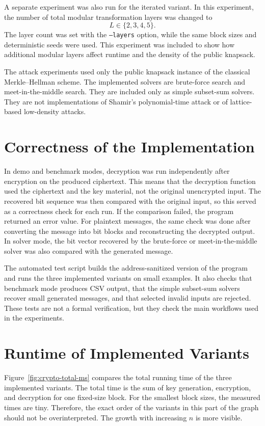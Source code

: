 A separate experiment was also run for the iterated variant. In this
experiment, the number of total modular transformation layers was changed to
\[
    L \in \{2,3,4,5\}.
\]
The layer count was set with the \texttt{--layers} option, while the same
block sizes and deterministic seeds were used. This experiment was included
to show how additional modular layers affect runtime and the density of the
public knapsack.

The attack experiments used only the public knapsack instance of the classical
Merkle--Hellman scheme. The implemented solvers are brute-force search and
meet-in-the-middle search. They are included only as simple subset-sum solvers.
They are not implementations of Shamir's polynomial-time attack or of
lattice-based low-density attacks.

\section{Correctness of the Implementation}

In demo and benchmark modes, decryption was run independently after encryption
on the produced ciphertext. This means that the decryption function used the
ciphertext and the key material, not the original unencrypted input. The
recovered bit sequence was then compared with the original input, so this
served as a correctness check for each run. If the comparison failed, the
program returned an error value. For plaintext messages, the same check was done
after converting the message into bit blocks and reconstructing the decrypted
output. In solver mode, the bit vector recovered by the brute-force or
meet-in-the-middle solver was also compared with the generated message.

The automated test script builds the address-sanitized version of the program
and runs the three implemented variants on small examples. It also checks that
benchmark mode produces CSV output, that the simple subset-sum solvers recover
small generated messages, and that selected invalid inputs are rejected. These
tests are not a formal verification, but they check the main workflows used in
the experiments.

\section{Runtime of Implemented Variants}

Figure~\ref{fig:crypto-total-ms} compares the total running time of the three
implemented variants. The total time is the sum of key generation, encryption,
and decryption for one fixed-size block. For the smallest block sizes, the
measured times are tiny. Therefore, the exact order of the variants in this
part of the graph should not be overinterpreted. The growth with increasing
\(n\) is more visible.

